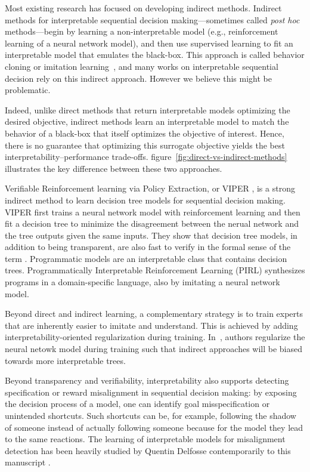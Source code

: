 Most existing research has focused on developing indirect methods. 
Indirect methods for interpretable sequential decision making—sometimes called \textit{post hoc} methods—begin by learning a non-interpretable model (e.g., reinforcement learning of a neural network model), and then use supervised learning to fit an interpretable model that emulates the black-box.
This approach is called behavior cloning or imitation learning~\cite{behavior-cloning,dagger}, and many works on interpretable sequential decision rely on this indirect approach\cite{viper,PIRL}.
However we believe this might be problematic.

Indeed, unlike direct methods that return interpretable models optimizing the desired objective, indirect methods learn an interpretable model to match the behavior of a black-box that itself optimizes the objective of interest. 
Hence, there is no guarantee that optimizing this surrogate objective yields the best interpretability–performance trade-offs. 
figure~\ref{fig:direct-vs-indirect-methods} illustrates the key difference between these two approaches. 

Verifiable Reinforcement learning via Policy Extraction, or VIPER \cite{viper}, is a strong indirect method to learn decision tree models for sequential decision making. VIPER first trains a neural network model with reinforcement learning and then fit a decision tree to minimize the disagreement between the nerual network and the tree outputs given the same inputs.
They show that decision tree models, in addition to being transparent, are also fast to verify in the formal sense of the term \cite{maraboupy}.
Programmatic models are an interpretable class that contains decision trees. 
Programmatically Interpretable Reinforcement Learning (PIRL) \cite{PIRL} synthesizes programs in a domain-specific language, also by imitating a neural network model. 

Beyond direct and indirect learning, a complementary strategy is to train experts that are inherently easier to imitate and understand.
This is achieved by adding interpretability-oriented regularization during training. In~\cite{parbhoo}, authors regularize the neural netowk model during training such that indirect approaches will be biased towards more interpretable trees.

Beyond transparency and verifiability, interpretability also supports detecting specification or reward misalignment in sequential decision making: by exposing the decision process of a model, one can identify goal misspecification or unintended shortcuts.
Such shortcuts can be, for example, following the shadow of someone instead of actually following someone because for the model they lead to the same reactions.
The learning of interpretable models for misalignment detection has been heavily studied by Quentin Delfosse contemporarily to this manuscript \cite{scobots}\cite{shindo2024blendrl}\cite{nudge}\cite{ocatari}.

